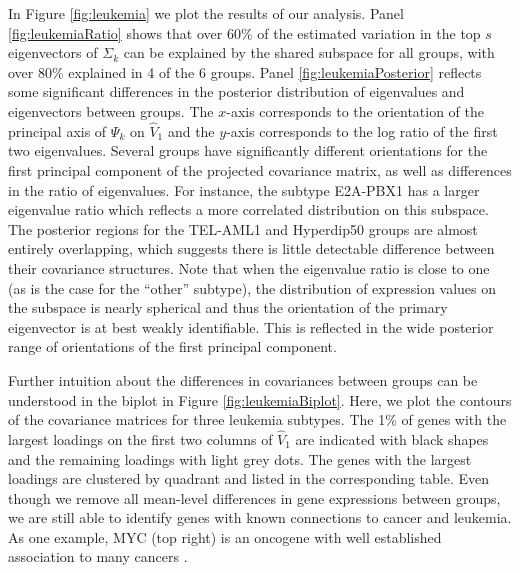 \documentclass{statsoc}
\begin{document}
In Figure \ref{fig:leukemia} we plot the results of our analysis.
Panel \ref{fig:leukemiaRatio} shows that over $60\%$ of the estimated
variation in the top $s$ eigenvectors of $\Sigma_k$ can be explained
by the shared subspace for all groups, with over 80\% explained in 4
of the 6 groups.  Panel \ref{fig:leukemiaPosterior} reflects some
significant differences in the posterior distribution of eigenvalues
and eigenvectors between groups.  The $x$-axis corresponds to the
orientation of the principal axis of $\Psi_k$ on $\hat{V}_1$ and the
$y$-axis corresponds to the log ratio of the first two eigenvalues.
Several groups have significantly different orientations for the first
principal component of the projected covariance matrix, as well as
differences in the ratio of eigenvalues.  For instance, the subtype
E2A-PBX1 has a larger eigenvalue ratio which reflects a more
correlated distribution on this subspace.  The posterior regions for
the TEL-AML1 and Hyperdip50 groups are almost entirely overlapping,
which suggests there is little detectable difference between their
covariance structures.  Note that when the eigenvalue ratio is close
to one (as is the case for the ``other'' subtype), the distribution of
expression values on the subspace is nearly spherical and thus the
orientation of the primary eigenvector is at best weakly identifiable.
This is reflected in the wide posterior range of orientations of the
first principal component.

Further intuition about the differences in covariances between groups
can be understood in the biplot in Figure \ref{fig:leukemiaBiplot}.
Here, we plot the contours of the covariance matrices for three
leukemia subtypes. The 1\% of genes with the largest loadings on the
first two columns of $\hat{V}_1$ are indicated with black shapes and the
remaining loadings with light grey dots.  The genes with the largest
loadings are clustered by quadrant and listed in the corresponding
table.  Even though we remove all mean-level differences in gene
expressions between groups, we are still able to identify genes with
known connections to cancer and leukemia.  As one example, MYC (top
right) is an oncogene with well established association to many
cancers \citep{Dang2012}.
\end{document}
